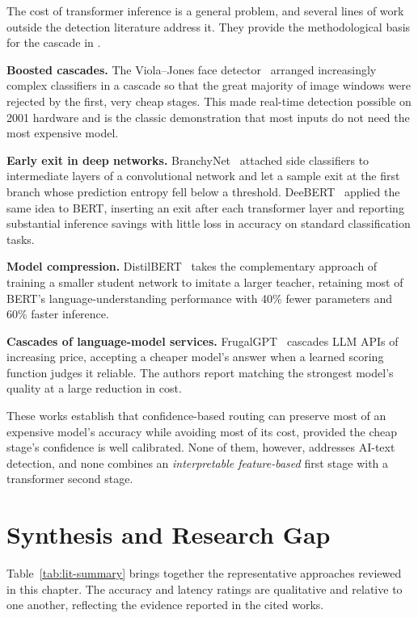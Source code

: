 The cost of transformer inference is a general problem, and several lines of
work outside the detection literature address it. They provide the
methodological basis for the cascade in \veriscript{}.

\textbf{Boosted cascades.} The Viola--Jones face detector~\cite{viola2001rapid}
arranged increasingly complex classifiers in a cascade so that the great
majority of image windows were rejected by the first, very cheap stages.
This made real-time detection possible on 2001 hardware and is the classic
demonstration that most inputs do not need the most expensive model.

\textbf{Early exit in deep networks.} BranchyNet~\cite{teerapittayanon2016branchynet}
attached side classifiers to intermediate layers of a convolutional network
and let a sample exit at the first branch whose prediction entropy fell below
a threshold. DeeBERT~\cite{xin2020deebert} applied the same idea to BERT,
inserting an exit after each transformer layer and reporting substantial
inference savings with little loss in accuracy on standard classification
tasks.

\textbf{Model compression.} DistilBERT~\cite{sanh2019distilbert} takes the
complementary approach of training a smaller student network to imitate a
larger teacher, retaining most of BERT's language-understanding performance
with 40\% fewer parameters and 60\% faster inference.

\textbf{Cascades of language-model services.} FrugalGPT~\cite{chen2023frugalgpt}
cascades LLM APIs of increasing price, accepting a cheaper model's answer when
a learned scoring function judges it reliable. The authors report matching the
strongest model's quality at a large reduction in cost.

These works establish that confidence-based routing can preserve most of an
expensive model's accuracy while avoiding most of its cost, provided the cheap
stage's confidence is well calibrated. None of them, however, addresses
AI-text detection, and none combines an \emph{interpretable feature-based}
first stage with a transformer second stage.

\section{Synthesis and Research Gap}

Table~\ref{tab:lit-summary} brings together the representative approaches
reviewed in this chapter. The accuracy and latency ratings are qualitative and
relative to one another, reflecting the evidence reported in the cited works.

